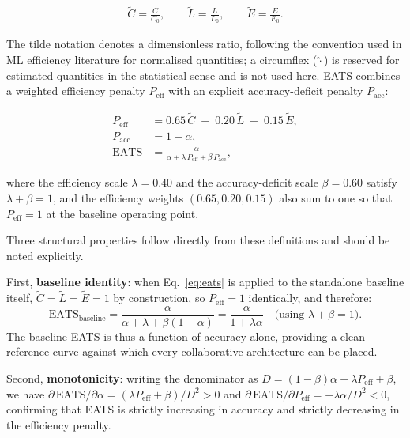 \begin{align}
    \tilde{C} = \frac{C}{C_0}, \qquad
    \tilde{L} = \frac{L}{L_0}, \qquad
    \tilde{E} = \frac{E}{E_0}.
    \label{eq:norm-components}
\end{align}

The tilde notation denotes a dimensionless ratio, following the convention used in ML efficiency literature for normalised quantities; a circumflex ($\hat{\cdot}$) is reserved for estimated quantities in the statistical sense and is not used here. EATS combines a weighted efficiency penalty $P_{\text{eff}}$ with an explicit accuracy-deficit penalty $P_{\text{acc}}$:

\begin{align}
    P_{\text{eff}} &= 0.65\,\tilde{C} \;+\; 0.20\,\tilde{L} \;+\; 0.15\,\tilde{E}, \label{eq:penalty} \\[4pt]
    P_{\text{acc}} &= 1 - \alpha, \label{eq:accdeficit} \\[4pt]
    \text{EATS} &= \frac{\alpha}{\alpha + \lambda\,P_{\text{eff}} + \beta\,P_{\text{acc}}}, \label{eq:eats}
\end{align}

where the efficiency scale $\lambda = 0.40$ and the accuracy-deficit scale $\beta = 0.60$ satisfy $\lambda + \beta = 1$, and the efficiency weights $(0.65, 0.20, 0.15)$ also sum to one so that $P_{\text{eff}} = 1$ at the baseline operating point.

Three structural properties follow directly from these definitions and should be noted explicitly.

First, \textbf{baseline identity}: when Eq.~\eqref{eq:eats} is applied to the standalone baseline itself, $\tilde{C} = \tilde{L} = \tilde{E} = 1$ by construction, so $P_{\text{eff}} = 1$ identically, and therefore:
\[
  \text{EATS}_{\text{baseline}} = \frac{\alpha}{\alpha + \lambda + \beta(1-\alpha)} = \frac{\alpha}{1 + \lambda\alpha} \quad \text{(using } \lambda + \beta = 1\text{)}.
\]
The baseline EATS is thus a function of accuracy alone, providing a clean reference curve against which every collaborative architecture can be placed.

Second, \textbf{monotonicity}: writing the denominator as $D = (1-\beta)\alpha + \lambda P_{\text{eff}} + \beta$, we have $\partial\,\text{EATS}/\partial\alpha = (\lambda P_{\text{eff}} + \beta)/D^2 > 0$ and $\partial\,\text{EATS}/\partial P_{\text{eff}} = -\lambda\alpha/D^2 < 0$, confirming that EATS is strictly increasing in accuracy and strictly decreasing in the efficiency penalty.

